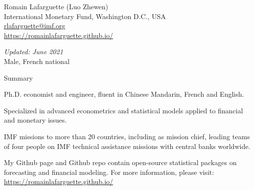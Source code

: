 \documentclass[usegeometry, 10pt, a4paper]{cv} %
\begin{document}
\hspace{15mm}
\begin{chapeau}
\begin{adresse}
\begin{flushleft}
    Romain Lafarguette (Luo Zhewen)\\
    International Monetary Fund, Washington D.C., USA \\
    \href{mailto:rlafarguette@imf.org}{rlafarguette@imf.org}\\
    \url{https://romainlafarguette.github.io/} \\
\end{flushleft}
\end{adresse}
\begin{etatcivil}
\begin{flushleft}
  \emph{Updated: June 2021}\\
Male, French national
\end{flushleft}
\end{etatcivil}
\end{chapeau}


\begin{rubriquetableau}[0.95\textwidth]{Summary}\\
  \vspace{-0.3cm}

\noindent Ph.D. economist and engineer, fluent in Chinese Mandarin, French and English.\\

\smallskip

\noindent Specialized in advanced econometrics and statistical models applied to
financial and monetary issues.\\ 

\smallskip

\noindent IMF missions to more than 20 countries, including as mission chief,
leading teams of four people on IMF technical assistance missions with central
banks worldwide.\\

\smallskip

\noindent My Github page and Github repo contain open-source statistical packages on
forecasting and financial modeling. For more information, please visit:   
\url{https://romainlafarguette.github.io/} \\

\smallskip
\end{rubriquetableau}

\vspace{0.5cm}
\end{document}
